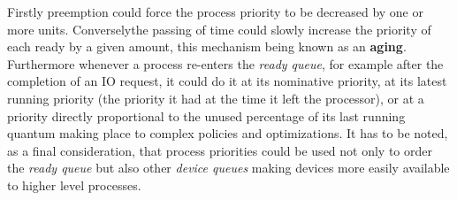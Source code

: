 \documentclass[11pt,a4paper]{scrreprt}
\begin{document}
\begin{itemize}
Firstly preemption could force the process priority to be decreased by one or more units. Converselythe passing of time could slowly increase the priority of each ready by a given amount, this mechanism being known as an \textbf{aging}. Furthermore whenever a process re-enters the \textit{ready queue}, for example after the completion of an IO request, it could do it at its nominative priority, at its latest running priority (the priority it had at the time it left the processor), or at a priority directly proportional to the unused percentage of its last running quantum making place to complex policies and optimizations. It has to be noted, as a final consideration, that process priorities could be used not only to order the \textit{ready queue} but also other \textit{device queues} making devices more easily available to higher level processes.
\end{itemize}
\end{document}
